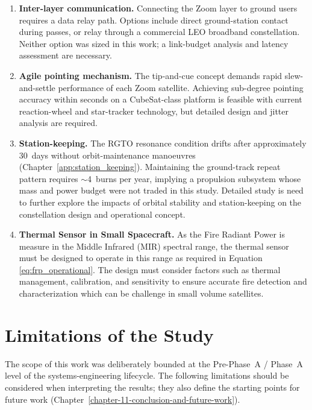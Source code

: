 \begin{enumerate}
    \item \textbf{Inter-layer communication.} Connecting the Zoom layer to ground users  requires a data relay path. Options include direct ground-station contact during passes, or relay through a commercial LEO broadband constellation. Neither option was sized in this work; a link-budget analysis and latency assessment are necessary.
    \item \textbf{Agile pointing mechanism.} The tip-and-cue concept demands rapid slew-and-settle performance of each Zoom satellite. Achieving sub-degree pointing accuracy within seconds on a CubeSat-class platform is feasible with current reaction-wheel and star-tracker technology, but detailed design and jitter analysis are required.
    \item \textbf{Station-keeping.} The RGTO resonance condition drifts after approximately 30~days without orbit-maintenance manoeuvres (Chapter~\ref{app:station_keeping}). Maintaining the ground-track repeat pattern requires $\sim$4~burns per year, implying a propulsion subsystem whose mass and power budget were not traded in this study. Detailed study is need to further explore the impacts of orbital stability and station-keeping on the constellation design and operational concept.
    \item  \textbf{Thermal Sensor in Small Spacecraft.} As the Fire Radiant Power is measure in the Middle Infrared (MIR) spectral range, the thermal sensor must be designed to operate in this range as required in Equation \ref{eq:frp_operational}. The design must consider factors such as thermal management, calibration, and sensitivity to ensure accurate fire detection and characterization which can be challenge in small volume satellites. 
\end{enumerate}

\section{Limitations of the Study}\label{sec:discussion-limitations}

The scope of this work was deliberately bounded at the Pre-Phase~A / Phase~A level of the systems-engineering lifecycle. The following limitations should be considered when interpreting the results; they also define the starting points for future work (Chapter~\ref{chapter-11-conclusion-and-future-work}).

